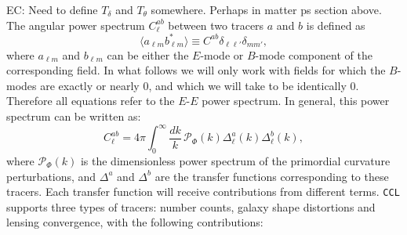 \documentclass[\docopts]{\docclass}
\newcommand{\elisa}[1]{\textcolor{green!10!orange!90!}{EC: #1}}
\newcommand{\ccl}{{\tt CCL}\xspace}
\begin{document}
\elisa{Need to define $T_\delta$ and $T_\theta$ somewhere. Perhaps in matter ps section above.}
The angular power spectrum $C^{ab}_\ell$ between two tracers $a$ and $b$ is defined as
\begin{equation}
  \langle a_{\ell m}b^*_{\ell m}\rangle\equiv C^{ab}\delta_{\ell\ell'}\delta_{mm'},
  \label{eq:clgen}
\end{equation}
where $a_{\ell m}$ and $b_{\ell m}$ can be either the $E$-mode or $B$-mode component of the corresponding field. In what follows we will only work with fields for which the $B$-modes are exactly or nearly $0$, and which we will take to be identically $0$. Therefore all equations refer to the $E$-$E$ power spectrum. In general, this power spectrum can be written as:
\begin{equation}
  C^{ab}_\ell=4\pi\int_0^\infty \frac{dk}{k}\,\mathcal{P}_\Phi(k)\Delta^a_\ell(k)\Delta^b_\ell(k),
  \label{eq:cls}
\end{equation}
where $\mathcal{P}_\Phi(k)$ is the dimensionless power spectrum of the primordial curvature perturbations, and $\Delta^a$ and $\Delta^b$ are the transfer functions corresponding to these tracers. Each transfer function will receive contributions from different terms. \ccl supports three types of tracers: number counts, galaxy shape distortions and lensing convergence, with the following contributions:
\end{document}
